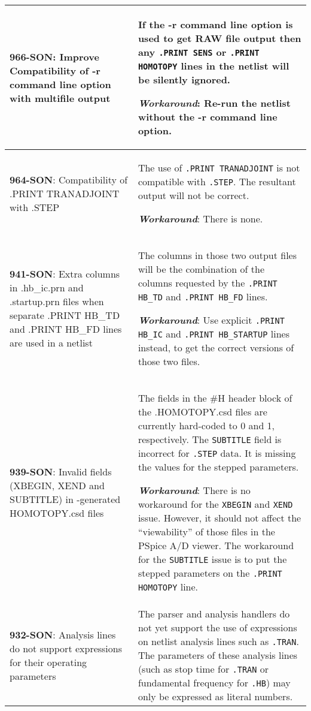 {\begin{longtable}[h] {>{\raggedright\small}m{2in}|>{\raggedright\let\\\tabularnewline\small}m{3.5in}}
\textbf{966-SON}: Improve Compatibility of -r command line option with multifile
output & If the -r command line option is used to get RAW file output
then any \texttt{.PRINT SENS} or \texttt{.PRINT HOMOTOPY} lines in the
netlist will be silently ignored.

\textbf{\textit{Workaround}}: Re-run the netlist without the -r command line
option.
\\ \hline

\textbf{964-SON}: Compatibility of .PRINT TRANADJOINT with .STEP & The use of
\texttt{.PRINT TRANADJOINT} is not compatible with \texttt{.STEP}.  The
resultant \Xyce{} output will not be correct.

\textbf{\textit{Workaround}}: There is none.
\\ \hline

\textbf{941-SON}: Extra columns in .hb\_ic.prn and .startup.prn files when
separate .PRINT HB\_TD and .PRINT HB\_FD lines are used in a netlist &
The columns in those two output files will be the combination of the
columns requested by the
\texttt{.PRINT HB\_TD} and \texttt{.PRINT HB\_FD} lines.

\textbf{\textit{Workaround}}: Use explicit \texttt{.PRINT HB\_IC} and
\texttt{.PRINT HB\_STARTUP} lines instead, to get the correct versions of
those two files.
\\ \hline

\textbf{939-SON}: Invalid fields (XBEGIN, XEND and SUBTITLE) in \Xyce{}-generated
HOMOTOPY.csd files & The fields in the \#H header block of the
.HOMOTOPY.csd files are currently hard-coded to 0 and 1, respectively.
The \texttt{SUBTITLE} field is incorrect for \texttt{.STEP} data.  It
is missing the values for the stepped parameters.

\textbf{\textit{Workaround}}: There is no workaround for the \texttt{XBEGIN}
and \texttt{XEND} issue.  However, it should not affect the
``viewability'' of those files in the PSpice A/D viewer.  The
workaround for the \texttt{SUBTITLE} issue is to put the stepped
parameters on the \texttt{.PRINT HOMOTOPY} line.
\\ \hline

\textbf{932-SON}: Analysis lines do not support expressions for their
operating parameters & The \Xyce{} parser and analysis handlers do not
yet support the use of expressions on netlist analysis lines such
as \texttt{.TRAN}.  The parameters of these analysis lines (such as
stop time for \texttt{.TRAN} or fundamental frequency
for \texttt{.HB}) may only be expressed as literal numbers.


\end{longtable}}
